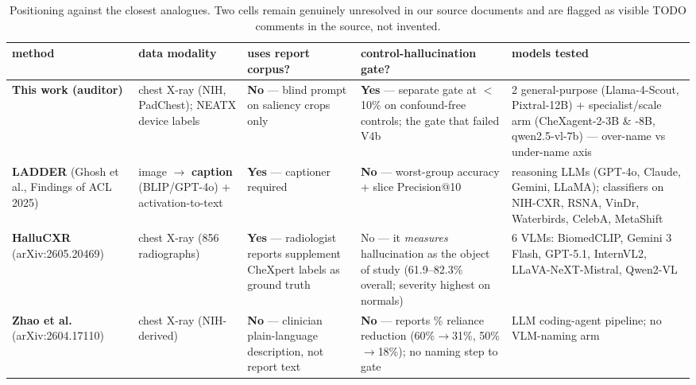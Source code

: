 \documentclass{ieeeaccess}
\begin{document}
\begin{table}[!t]
\caption{Positioning against the closest analogues. Two cells remain genuinely unresolved in our source documents and are flagged as visible TODO comments in the source, not invented.}
\label{tab:positioning}
\centering
\footnotesize
\renewcommand{\arraystretch}{1.3}
\begin{tabular}{p{2.3cm} p{2.6cm} p{2.3cm} p{3.0cm} p{3.4cm}}
\toprule
\textbf{method} & \textbf{data modality} & \textbf{uses report corpus?} & \textbf{control-hallucination gate?} & \textbf{models tested} \\
\midrule
\textbf{This work (auditor)} & chest X-ray (NIH, PadChest); NEATX device labels & \textbf{No} --- blind prompt on saliency crops only & \textbf{Yes} --- separate gate at $<$10\% on confound-free controls; the gate that failed V4b & 2 general-purpose (Llama-4-Scout, Pixtral-12B) + specialist/scale arm (CheXagent-2-3B \& -8B, qwen2.5-vl-7b) --- over-name vs under-name axis \\
\textbf{LADDER} (Ghosh et al., Findings of ACL 2025) & image $\rightarrow$ \textbf{caption} (BLIP/GPT-4o) + activation-to-text & \textbf{Yes} --- captioner required & \textbf{No} --- worst-group accuracy + slice Precision@10 & reasoning LLMs (GPT-4o, Claude, Gemini, LLaMA); classifiers on NIH-CXR, RSNA, VinDr, Waterbirds, CelebA, MetaShift \\
\textbf{HalluCXR} (arXiv:2605.20469) & chest X-ray (856 radiographs) & \textbf{Yes} --- radiologist reports supplement CheXpert labels as ground truth & No --- it \emph{measures} hallucination as the object of study (61.9--82.3\% overall; severity highest on normals) & 6 VLMs: BiomedCLIP, Gemini 3 Flash, GPT-5.1, InternVL2, LLaVA-NeXT-Mistral, Qwen2-VL \\
\textbf{Zhao et al.} (arXiv:2604.17110) & chest X-ray (NIH-derived) & \textbf{No} --- clinician plain-language description, not report text & \textbf{No} --- reports \% reliance reduction (60\%$\rightarrow$31\%, 50\%$\rightarrow$18\%); no naming step to gate & LLM coding-agent pipeline; no VLM-naming arm \\
\bottomrule
\end{tabular}
\end{table}

\end{document}
